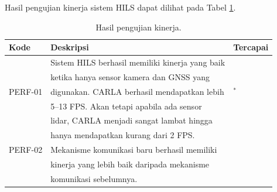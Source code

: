 Hasil pengujian kinerja sistem HILS dapat dilihat pada Tabel \ref{chapter-4-tbl-perf-criteria-result}.
\begin{table}[!htbp]
	\begin{center}
		\begin{tabular}{|l|l|l|}
			\hline
			\textbf{Kode} & \textbf{Deskripsi}                              & \textbf{Tercapai} \\
			\hline
			              & Sistem HILS berhasil memiliki kinerja yang baik &                   \\
			              & ketika hanya sensor kamera dan GNSS yang        &                   \\
			PERF-01       & digunakan. CARLA berhasil mendapatkan lebih     & \checkmark$^*$    \\
			              & 5--13 FPS. Akan tetapi apabila ada sensor       &                   \\
			              & lidar, CARLA menjadi sangat lambat hingga       &                   \\
			              & hanya mendapatkan kurang dari 2 FPS.            &                   \\
			\hline
			PERF-02       & Mekanisme komunikasi baru berhasil memiliki     &                   \\
			              & kinerja yang lebih baik daripada mekanisme      & \checkmark        \\
			              & komunikasi sebelumnya.                          &                   \\
			\hline
		\end{tabular}
	\end{center}

	\caption{Hasil pengujian kinerja.}
	\label{chapter-4-tbl-perf-criteria-result}
\end{table}

